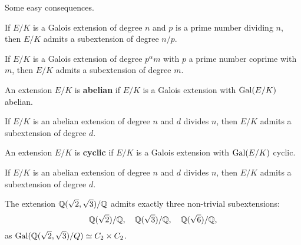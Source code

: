 Some easy consequences.

\begin{exercise}
    If $E/K$ is a Galois extension of degree $n$ and
    $p$ is a prime number dividing $n$, then $E/K$ admits
    a subextension of degree $n/p$. 
\end{exercise}
    
\begin{exercise}
    If $E/K$ is a Galois extension of degree $p^\alpha m$ with
    $p$ a prime number coprime with $m$, then $E/K$ admits 
    a subextension of degree $m$. 
\end{exercise}

\begin{definition}
    An extension $E/K$ is \textbf{abelian} if $E/K$ is a Galois extension
    with $\operatorname{Gal}(E/K)$ abelian.
\end{definition}

\begin{exercise}
    If $E/K$ is an abelian extension of degree $n$ and $d$ divides
    $n$, then $E/K$ admits a subextension of degree $d$. 
\end{exercise}

\begin{definition}
    An extension $E/K$ is \textbf{cyclic} if $E/K$ is 
    a Galois extension with $\operatorname{Gal}(E/K)$ cyclic. 
\end{definition}

\begin{exercise}
    If $E/K$ is an abelian extension of degree $n$ and $d$ divides
    $n$, then $E/K$ admits a subextension of degree $d$. 
\end{exercise}

\begin{example}
    The extension $\mathbb{Q}(\sqrt{2},\sqrt{3})/\mathbb{Q}$ admits
    exactly three non-trivial subextensions: 
    \[
    \mathbb{Q}(\sqrt{2})/\mathbb{Q},
    \quad
    \mathbb{Q}(\sqrt{3})/\mathbb{Q},
    \quad 
    \mathbb{Q}(\sqrt{6})/\mathbb{Q},
    \]
    as $\operatorname{Gal}(\mathbb{Q}(\sqrt{2},\sqrt{3})/Q)\simeq C_2\times C_2$. 
\end{example}

